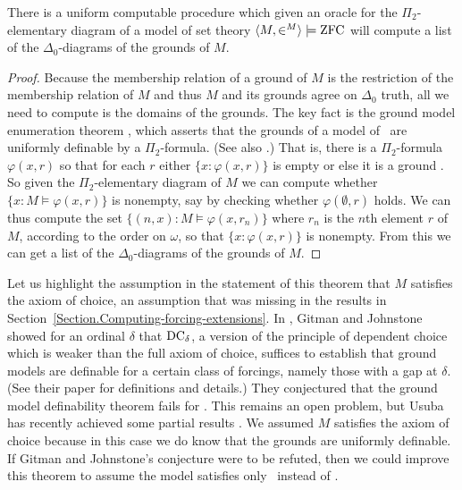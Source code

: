 \documentclass{amsart}
\begin{document}
\begin{lemma}\label{Lemma.Computing-grounds}
There is a uniform computable procedure which given an oracle for the $\Pi_2$-elementary diagram of a model of set theory $\<M,\in^M> \models \ZFC$ will compute a list of the $\Delta_0$-diagrams of the grounds of $M$.
\end{lemma}

\begin{proof}
Because the membership relation of a ground of $M$ is the restriction of the membership relation of $M$ and thus $M$ and its grounds agree on $\Delta_0$ truth, all we need to compute is the domains of the grounds.
The key fact is the ground model enumeration theorem \cite[Theorem 12]{FuchsHamkinsReitz2015:Set-theoreticGeology}, which asserts that the grounds of a model of \ZFC\ are uniformly definable by a $\Pi_2$-formula. (See also \cite[Section~2]{BagariaHamkinsTsaprounisUsuba2016:SuperstrongAndOtherLargeCardinalsAreNeverLaverIndestructible}.) That is, there is a $\Pi_2$-formula $\varphi(x,r)$ so that for each $r$ either $\{ x : \varphi(x,r) \}$ is empty or else it is a ground \cite{FuchsHamkinsReitz2015:Set-theoreticGeology}.
So given the $\Pi_2$-elementary diagram of $M$ we can compute whether $\{ x : M \models \varphi(x,r) \}$ is nonempty, say by checking whether $\varphi(\emptyset,r)$ holds. We can thus compute the set $\{ (n,x) : M \models \varphi(x,r_n) \}$ where $r_n$ is the $n$th element $r$ of $M$, according to the order on $\omega$, so that $\{ x : \varphi(x,r) \}$ is nonempty. From this we can get a list of the $\Delta_0$-diagrams of the grounds of $M$.
\end{proof}

Let us highlight the assumption in the statement of this theorem that $M$ satisfies the axiom of choice, an assumption that was missing in the results in Section~\ref{Section.Computing-forcing-extensions}. In \cite{gitmanjohnstone:groundmodels}, Gitman and Johnstone showed for an ordinal $\delta$ that ${\rm DC}_\delta$, a version of the principle of dependent choice which is weaker than the full axiom of choice, suffices to establish that ground models are definable for a certain class of forcings, namely those with a gap at $\delta$. (See their paper for definitions and details.) They conjectured that the ground model definability theorem fails for \ZF. This remains an open problem, but Usuba has recently achieved some partial results \cite{usuba2019}. We assumed $M$ satisfies the axiom of choice because in this case we do know that the grounds are uniformly definable. If Gitman and Johnstone's conjecture were to be refuted, then we could improve this theorem to assume the model satisfies only \ZF\ instead of \ZFC.
\end{document}
